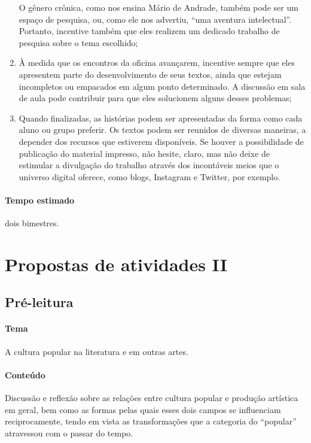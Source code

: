 \documentclass[12pt]{extarticle}
\begin{document}
\begin{enumerate}
  O gênero crônica, como nos ensina Mário de Andrade, também pode ser um
  espaço de pesquisa, ou, como ele nos advertiu, ``uma aventura
  intelectual''. Portanto, incentive também que eles realizem um dedicado
  trabalho de pesquisa sobre o tema escolhido;
\item
  À medida que os encontros da oficina avançarem, incentive sempre que
  eles apresentem parte do desenvolvimento de seus textos, ainda que
  estejam incompletos ou empacados em algum ponto determinado. A
  discussão em sala de aula pode contribuir para que eles solucionem
  alguns desses problemas;
\item
  Quando finalizadas, as histórias podem ser apresentadas da forma como
  cada aluno ou grupo preferir. Os textos podem ser reunidos de diversas
  maneiras, a depender dos recursos que estiverem disponíveis. Se houver
  a possibilidade de publicação do material impresso, não hesite, claro,
  mas não deixe de estimular a divulgação do trabalho através dos
  incontáveis meios que o universo digital oferece, como blogs,
  Instagram e Twitter, por exemplo.
\end{enumerate}

\paragraph{Tempo estimado} dois bimestres.

\section{Propostas de atividades II}

\subsection{Pré-leitura}


\paragraph{Tema} A cultura popular na literatura e em outras artes.

\paragraph{Conteúdo} Discussão e reflexão sobre as relações entre cultura
popular e produção artística em geral, bem como as formas pelas quais esses
dois campos se influenciam reciprocamente, tendo em vista as
transformações que a categoria do ``popular'' atravessou com o passar do
tempo.
\end{document}
